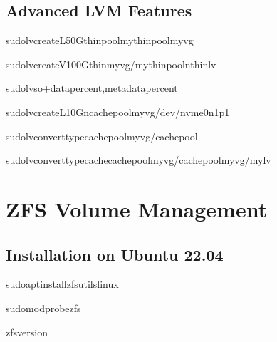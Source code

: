 \documentclass[letterpaper,10pt,english]{sphinxmanual}
\begin{document}
\subsection{Advanced LVM Features}
\label{\detokenize{volume-management:advanced-lvm-features}}
\sphinxAtStartPar
{}

\begin{sphinxVerbatim}[commandchars=\\\{\}]
sudolvcreate\PYGZhy{}L50G\PYGZhy{}\PYGZhy{}thinpoolmythinpoolmyvg

sudolvcreate\PYGZhy{}V100G\PYGZhy{}\PYGZhy{}thinmyvg/mythinpool\PYGZhy{}nthinlv

sudolvs\PYGZhy{}o+data\PYGZus{}percent,metadata\PYGZus{}percent
\end{sphinxVerbatim}

\sphinxAtStartPar
{}

\begin{sphinxVerbatim}[commandchars=\\\{\}]
sudolvcreate\PYGZhy{}L10G\PYGZhy{}ncachepoolmyvg/dev/nvme0n1p1

sudolvconvert\PYGZhy{}\PYGZhy{}typecache\PYGZhy{}poolmyvg/cachepool

sudolvconvert\PYGZhy{}\PYGZhy{}typecache\PYGZhy{}\PYGZhy{}cachepoolmyvg/cachepoolmyvg/mylv
\end{sphinxVerbatim}


\section{ZFS Volume Management}
\label{\detokenize{volume-management:zfs-volume-management}}

\subsection{Installation on Ubuntu 22.04}
\label{\detokenize{volume-management:installation-on-ubuntu-22-04}}
\begin{sphinxVerbatim}[commandchars=\\\{\}]
sudoaptinstallzfsutils\PYGZhy{}linux

sudomodprobezfs

zfsversion
\end{sphinxVerbatim}
\end{document}
